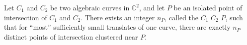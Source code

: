 Let $C_1$ and $C_2$ be two algebraic curves in $\mathbb{C}^2$, and let $P$ be an isolated point of intersection of $C_1$ and $C_2$. There exists an integer $n_P$, called the  $C_1$  $C_2$  $P$, such that for ``most'' sufficiently small translates of one curve, there are exactly $n_P$ distinct points of intersection clustered near $P$.
